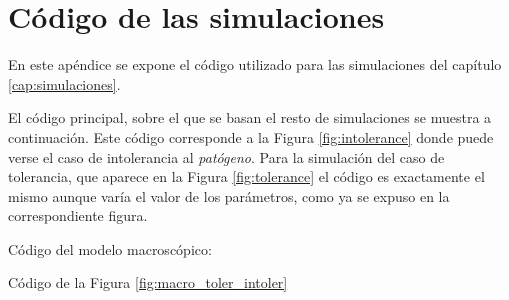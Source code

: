 \chapter{Código de las simulaciones}
\label{Appendix:A}

En este apéndice se expone el código utilizado para las simulaciones del capítulo \ref{cap:simulaciones}. 

El código principal, sobre el que se basan el resto de simulaciones se muestra a continuación. Este código corresponde a la Figura \ref{fig:intolerance} donde puede verse el caso de intolerancia al \textit{patógeno}. Para la 
simulación del caso de tolerancia, que aparece en la Figura \ref{fig:tolerance} el código es exactamente el mismo aunque varía el valor de los parámetros, como ya se expuso en la correspondiente figura. 




Código del modelo macroscópico:



Código de la Figura \ref{fig:macro_toler_intoler} 




